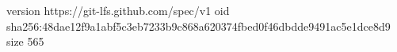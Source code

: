version https://git-lfs.github.com/spec/v1
oid sha256:48dae12f9a1abf5c3eb7233b9c868a620374fbed0f46dbdde9491ac5e1dce8d9
size 565
